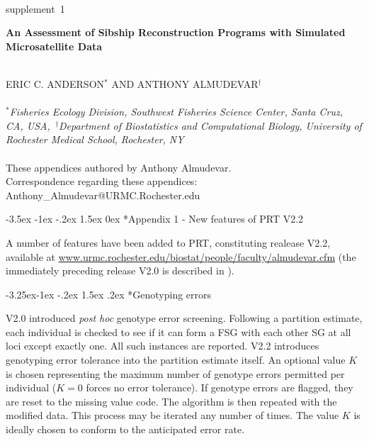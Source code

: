\documentclass[twoside,10pt,twocolumn]{article}
\makeatletter
\renewcommand\section{\@startsection {section}{1}{\z@}%
                                   {-3.5ex \@plus -1ex \@minus -.2ex}%
                                   {1.5ex \@plus 0ex}%
                                   {\normalfont\normalsize\bfseries}}
\renewcommand\subsection{\@startsection{subsection}{2}{\z@}%
                                     {-3.25ex\@plus -1ex \@minus -.2ex}%
                                     {1.5ex \@plus .2ex}%
                                     {\normalfont\normalsize\itshape}}
\makeatother
\begin{document}
\pagestyle{fancyplain}



   \begin{strip}
   \vspace*{-.5in}
   \mbox{}\\
   {\large\sc supplement~1}
   \mbox{}\\
        {\LARGE\bf An Assessment of Sibship Reconstruction Programs with Simulated Microsatellite Data \par}
    \mbox{}\\
    \uppercase{ Eric C. Anderson$^*$ and Anthony Almudevar$^\dagger$} \\
       \mbox{}\\
    $^*${\em Fisheries Ecology Division, Southwest Fisheries Science Center, Santa Cruz, CA, 
    USA,~$^\dagger$Department of Biostatistics and Computational Biology,
		University of Rochester Medical School, Rochester, NY}\\
    \mbox{}\\
    These appendices authored by Anthony Almudevar.\\
    Correspondence regarding these appendices: Anthony\_Almudevar@URMC.Rochester.edu
\vspace*{.4in}
   \end{strip}


\section*{Appendix 1 - New features of PRT V2.2} 

A number of features have been added to PRT, constituting realease V2.2, available at  
\url{www.urmc.rochester.edu/biostat/people/faculty/almudevar.cfm}  (the immediately preceding release V2.0 
is described in \citet{alm&and11}).

\subsection*{Genotyping errors}

V2.0 introduced \emph{post hoc} genotype error screening.  Following a partition estimate, each individual 
is checked to see if it can form a FSG with each other SG at all loci except exactly one. All such instances 
are reported. V2.2 introduces genotyping error tolerance into the partition estimate itself. An optional 
value $K$ is chosen representing the maximum number of genotype errors permitted per individual ($K=0$ 
forces no error tolerance). If genotype errors are flagged, they are reset to the missing value code. The 
algorithm is then repeated with the modified data. This process may be iterated any number of times.   The 
value $K$ is ideally chosen to conform to the anticipated error rate. 
\end{document}

